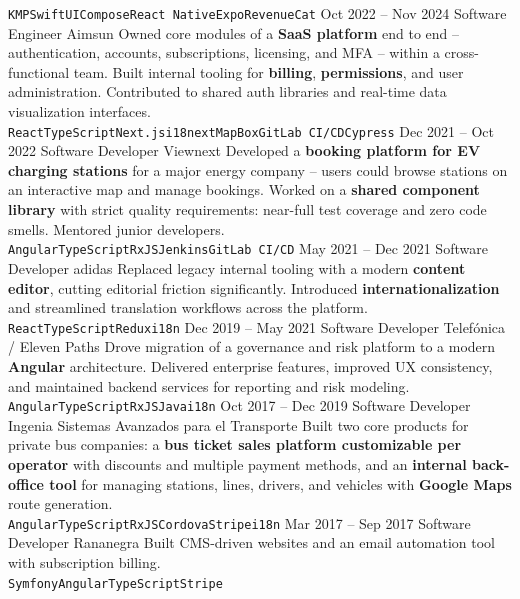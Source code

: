\documentclass[9pt]{developercv} %
\begin{document}
\begin{entrylist}
{		\texttt{KMP}\slashsep\texttt{SwiftUI}\slashsep\texttt{Compose}\slashsep\texttt{React Native}\slashsep\texttt{Expo}\slashsep\texttt{RevenueCat}}
	\entry
		{Oct 2022 -- Nov 2024}
		{Software Engineer}
		{Aimsun}
		{Owned core modules of a \textbf{SaaS platform} end to end -- authentication, accounts, subscriptions, licensing, and MFA -- within a cross-functional team. Built internal tooling for \textbf{billing}, \textbf{permissions}, and user administration. Contributed to shared auth libraries and real-time data visualization interfaces. \\
		\texttt{React}\slashsep\texttt{TypeScript}\slashsep\texttt{Next.js}\slashsep\texttt{i18next}\slashsep\texttt{MapBox}\slashsep\texttt{GitLab CI/CD}\slashsep\texttt{Cypress}}
	\entry
		{Dec 2021 -- Oct 2022}
		{Software Developer}
		{Viewnext}
		{Developed a \textbf{booking platform for EV charging stations} for a major energy company -- users could browse stations on an interactive map and manage bookings. Worked on a \textbf{shared component library} with strict quality requirements: near-full test coverage and zero code smells. Mentored junior developers. \\
		\texttt{Angular}\slashsep\texttt{TypeScript}\slashsep\texttt{RxJS}\slashsep\texttt{Jenkins}\slashsep\texttt{GitLab CI/CD}}
	\entry
		{May 2021 -- Dec 2021}
		{Software Developer}
		{adidas}
		{Replaced legacy internal tooling with a modern \textbf{content editor}, cutting editorial friction significantly. Introduced \textbf{internationalization} and streamlined translation workflows across the platform. \\
		\texttt{React}\slashsep\texttt{TypeScript}\slashsep\texttt{Redux}\slashsep\texttt{i18n}}
	\entry
		{Dec 2019 -- May 2021}
		{Software Developer}
		{Telefónica / Eleven Paths}
		{Drove migration of a governance and risk platform to a modern \textbf{Angular} architecture. Delivered enterprise features, improved UX consistency, and maintained backend services for reporting and risk modeling. \\
		\texttt{Angular}\slashsep\texttt{TypeScript}\slashsep\texttt{RxJS}\slashsep\texttt{Java}\slashsep\texttt{i18n}}
	\entry
		{Oct 2017 -- Dec 2019}
		{Software Developer}
		{Ingenia Sistemas Avanzados para el Transporte}
		{Built two core products for private bus companies: a \textbf{bus ticket sales platform customizable per operator} with discounts and multiple payment methods, and an \textbf{internal back-office tool} for managing stations, lines, drivers, and vehicles with \textbf{Google Maps} route generation. \\
		\texttt{Angular}\slashsep\texttt{TypeScript}\slashsep\texttt{RxJS}\slashsep\texttt{Cordova}\slashsep\texttt{Stripe}\slashsep\texttt{i18n}}
	\entry
		{Mar 2017 -- Sep 2017}
		{Software Developer}
		{Rananegra}
		{Built CMS-driven websites and an email automation tool with subscription billing. \\
		\texttt{Symfony}\slashsep\texttt{Angular}\slashsep\texttt{TypeScript}\slashsep\texttt{Stripe}}
\end{entrylist}
\end{document}
